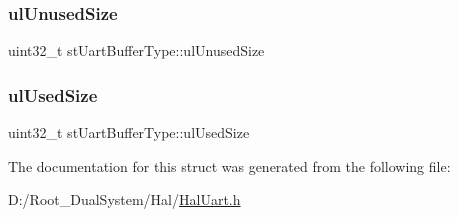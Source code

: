 \subsubsection{\texorpdfstring{ul\+Unused\+Size}{ulUnusedSize}}
{\footnotesize\ttfamily uint32\+\_\+t st\+Uart\+Buffer\+Type\+::ul\+Unused\+Size}

\mbox{\label{structst_uart_buffer_type_a6de52817cb21b650a07a457858ed4df6}} 
\subsubsection{\texorpdfstring{ul\+Used\+Size}{ulUsedSize}}
{\footnotesize\ttfamily uint32\+\_\+t st\+Uart\+Buffer\+Type\+::ul\+Used\+Size}



The documentation for this struct was generated from the following file\+:\begin{DoxyCompactItemize}
\item 
D\+:/\+Root\+\_\+\+Dual\+System/\+Hal/\mbox{\hyperlink{_hal_uart_8h}{Hal\+Uart.\+h}}\end{DoxyCompactItemize}
